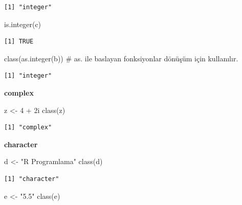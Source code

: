 \documentclass[
  letterpaper,
  DIV=11,
  numbers=noendperiod]{scrreprt}
\newenvironment{Shaded}{\begin{snugshade}}{\end{snugshade}}
\newcommand{\CommentTok}[1]{\textcolor[rgb]{0.37,0.37,0.37}{#1}}
\newcommand{\DecValTok}[1]{\textcolor[rgb]{0.68,0.00,0.00}{#1}}
\newcommand{\FunctionTok}[1]{\textcolor[rgb]{0.28,0.35,0.67}{#1}}
\newcommand{\NormalTok}[1]{\textcolor[rgb]{0.00,0.23,0.31}{#1}}
\newcommand{\OtherTok}[1]{\textcolor[rgb]{0.00,0.23,0.31}{#1}}
\newcommand{\SpecialCharTok}[1]{\textcolor[rgb]{0.37,0.37,0.37}{#1}}
\newcommand{\StringTok}[1]{\textcolor[rgb]{0.13,0.47,0.30}{#1}}
\begin{document}
\begin{verbatim}
[1] "integer"
\end{verbatim}

\begin{Shaded}
\begin{Highlighting}[]
\FunctionTok{is.integer}\NormalTok{(c)}
\end{Highlighting}
\end{Shaded}

\begin{verbatim}
[1] TRUE
\end{verbatim}

\begin{Shaded}
\begin{Highlighting}[]
\FunctionTok{class}\NormalTok{(}\FunctionTok{as.integer}\NormalTok{(b)) }\CommentTok{\# as. ile baslayan fonksiyonlar dönüşüm için kullanılır.}
\end{Highlighting}
\end{Shaded}

\begin{verbatim}
[1] "integer"
\end{verbatim}

\textbf{complex}

\begin{Shaded}
\begin{Highlighting}[]
\NormalTok{z }\OtherTok{\textless{}{-}} \DecValTok{4} \SpecialCharTok{+} \DecValTok{2}\NormalTok{i}
\FunctionTok{class}\NormalTok{(z)}
\end{Highlighting}
\end{Shaded}

\begin{verbatim}
[1] "complex"
\end{verbatim}

\textbf{character}

\begin{Shaded}
\begin{Highlighting}[]
\NormalTok{d }\OtherTok{\textless{}{-}} \StringTok{"R Programlama"}
\FunctionTok{class}\NormalTok{(d)}
\end{Highlighting}
\end{Shaded}

\begin{verbatim}
[1] "character"
\end{verbatim}

\begin{Shaded}
\begin{Highlighting}[]
\NormalTok{e }\OtherTok{\textless{}{-}} \StringTok{"5.5"}
\FunctionTok{class}\NormalTok{(e)}
\end{Highlighting}
\end{Shaded}
\end{document}
